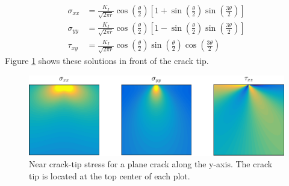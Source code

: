 \begin{align}
	\sigma_{xx} & =  \frac{K_I}{\sqrt{2\pi r}} \cos\left(\frac{\theta}{2}\right) \left[ 1+\sin\left(\frac{\theta}{2} \right)\sin\left( \frac{3\theta}{2}\right)\right]\\
	\sigma_{yy} & =  \frac{K_I}{\sqrt{2\pi r}} \cos\left(\frac{\theta}{2}\right) \left[ 1-\sin\left(\frac{\theta}{2} \right)\sin\left( \frac{3\theta}{2}\right)\right]\\	
	\tau_{xy} & =  \frac{K_I}{\sqrt{2\pi r}} \cos\left(\frac{\theta}{2}\right)\sin\left(\frac{\theta}{2} \right)\cos\left( \frac{3\theta}{2}\right)
\end{align}
Figure \ref{fig:analytic_stress} shows these solutions in front of the crack tip.

\begin{figure}
\centering
\includegraphics[width=\textwidth]{../figures/thesis/analytic_stress.pdf}
\caption{Near crack-tip stress for a plane crack along the y-axis. The crack tip is located at the top center of each plot.}
\label{fig:analytic_stress}
\end{figure}

